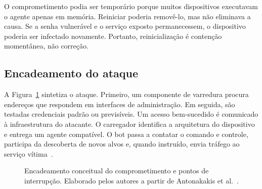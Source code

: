 \documentclass[11pt,a4paper]{article}
\begin{document}
O comprometimento podia ser temporário porque muitos dispositivos executavam o agente apenas em memória. Reiniciar poderia removê-lo, mas não eliminava a causa. Se a senha vulnerável e o serviço exposto permanecessem, o dispositivo poderia ser infectado novamente. Portanto, reinicialização é contenção momentânea, não correção.

\subsection{Encadeamento do ataque}
A Figura~\ref{fig:ataque} sintetiza o ataque. Primeiro, um componente de varredura procura endereços que respondem em interfaces de administração. Em seguida, são testadas credenciais padrão ou previsíveis. Um acesso bem-sucedido é comunicado à infraestrutura do atacante. O carregador identifica a arquitetura do dispositivo e entrega um agente compatível. O bot passa a contatar o comando e controle, participa da descoberta de novos alvos e, quando instruído, envia tráfego ao serviço vítima~\cite{antonakakis2017}.

\begin{figure}[t]
\centering
{}
\caption{Encadeamento conceitual do comprometimento e pontos de interrupção. Elaborado pelos autores a partir de Antonakakis et al.~\cite{antonakakis2017}.}
\label{fig:ataque}
\end{figure}
\end{document}
